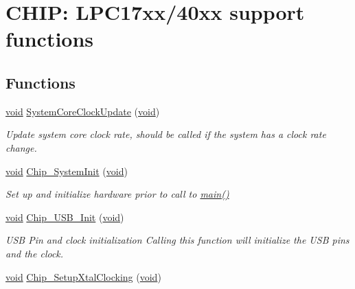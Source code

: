 \hypertarget{group__SUPPORT__17XX__40XX__FUNC}{\section{C\-H\-I\-P\-: L\-P\-C17xx/40xx support functions}
\label{group__SUPPORT__17XX__40XX__FUNC}
}
\subsection*{Functions}
\begin{DoxyCompactItemize}
\item 
\hyperlink{Paradigm_2Tern__EE_2small_2portmacro_8h_a14d32f8130d3c0b212cfc751730b5b49}{void} \hyperlink{group__SUPPORT__17XX__40XX__FUNC_gae0c36a9591fe6e9c45ecb21a794f0f0f}{System\-Core\-Clock\-Update} (\hyperlink{Paradigm_2Tern__EE_2small_2portmacro_8h_a14d32f8130d3c0b212cfc751730b5b49}{void})
\begin{DoxyCompactList}\small\item\em Update system core clock rate, should be called if the system has a clock rate change. \end{DoxyCompactList}\item 
\hyperlink{Paradigm_2Tern__EE_2small_2portmacro_8h_a14d32f8130d3c0b212cfc751730b5b49}{void} \hyperlink{group__SUPPORT__17XX__40XX__FUNC_ga3450fa020f6b569cc2deb69c11e11b7c}{Chip\-\_\-\-System\-Init} (\hyperlink{Paradigm_2Tern__EE_2small_2portmacro_8h_a14d32f8130d3c0b212cfc751730b5b49}{void})
\begin{DoxyCompactList}\small\item\em Set up and initialize hardware prior to call to \hyperlink{boot_8c_a840291bc02cba5474a4cb46a9b9566fe}{main()} \end{DoxyCompactList}\item 
\hyperlink{Paradigm_2Tern__EE_2small_2portmacro_8h_a14d32f8130d3c0b212cfc751730b5b49}{void} \hyperlink{group__SUPPORT__17XX__40XX__FUNC_gaa098023402e8e6034f34663ce39d9ccd}{Chip\-\_\-\-U\-S\-B\-\_\-\-Init} (\hyperlink{Paradigm_2Tern__EE_2small_2portmacro_8h_a14d32f8130d3c0b212cfc751730b5b49}{void})
\begin{DoxyCompactList}\small\item\em U\-S\-B Pin and clock initialization Calling this function will initialize the U\-S\-B pins and the clock. \end{DoxyCompactList}\item 
\hyperlink{Paradigm_2Tern__EE_2small_2portmacro_8h_a14d32f8130d3c0b212cfc751730b5b49}{void} \hyperlink{group__SUPPORT__17XX__40XX__FUNC_ga18737e4a022570724c77c5cdea9c0258}{Chip\-\_\-\-Setup\-Xtal\-Clocking} (\hyperlink{Paradigm_2Tern__EE_2small_2portmacro_8h_a14d32f8130d3c0b212cfc751730b5b49}{void})

\end{DoxyCompactItemize}
